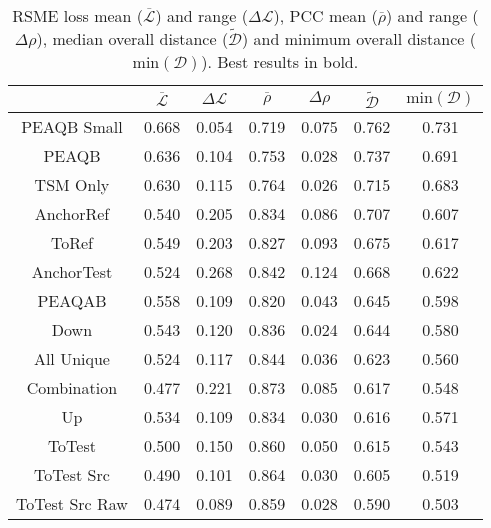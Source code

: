 \begin{table*}[ht]
\caption{RSME loss mean ($\overline{\mathcal{L}}$) and range ($\Delta\mathcal{L}$), PCC mean ($\overline{\rho}$) and range ($\Delta\rho$), median overall distance ($\widetilde{\mathcal{D}}$) and minimum overall distance ($\text{min}(\mathcal{D})$).  Best results in bold.}
\centering
\begin{ruledtabular}
\begin{tabular}{ccccccc}
 & $\overline{\mathcal{L}}$ & $\Delta\mathcal{L}$ & $\overline{\rho}$ & $\Delta\rho$ & $\widetilde{\mathcal{D}}$ & $\text{min}(\mathcal{D})$ \\
\hline
PEAQB Small & 0.668 & 0.054 & 0.719 & 0.075 & 0.762 & 0.731 \\
\hline
PEAQB & 0.636 & 0.104 & 0.753 & 0.028 & 0.737 & 0.691 \\
\hline
TSM Only & 0.630 & 0.115 & 0.764 & 0.026 & 0.715 & 0.683 \\
\hline
AnchorRef & 0.540 & 0.205 & 0.834 & 0.086 & 0.707 & 0.607 \\
\hline
ToRef & 0.549 & 0.203 & 0.827 & 0.093 & 0.675 & 0.617 \\
\hline
AnchorTest & 0.524 & 0.268 & 0.842 & 0.124 & 0.668 & 0.622 \\
\hline
PEAQAB & 0.558 & 0.109 & 0.820 & 0.043 & 0.645 & 0.598 \\
\hline
Down & 0.543 & 0.120 & 0.836 & 0.024 & 0.644 & 0.580 \\
\hline
All Unique & 0.524 & 0.117 & 0.844 & 0.036 & 0.623 & 0.560 \\
\hline
Combination & 0.477 & 0.221 & 0.873 & 0.085 & 0.617 & 0.548 \\
\hline
Up & 0.534 & 0.109 & 0.834 & 0.030 & 0.616 & 0.571 \\
\hline
ToTest & 0.500 & 0.150 & 0.860 & 0.050 & 0.615 & 0.543 \\
\hline
ToTest Src & 0.490 & 0.101 & 0.864 & 0.030 & 0.605 & 0.519 \\
\hline
ToTest Src Raw & 0.474 & 0.089 & 0.859 & 0.028 & 0.590 & 0.503 \\
\end{tabular}
\end{ruledtabular}
\label{tab:RMSE_PCC}
\end{table*}
